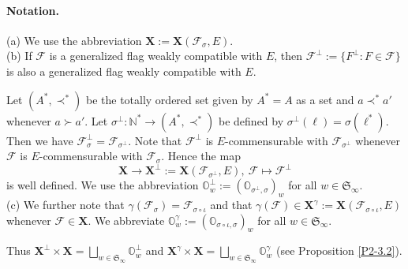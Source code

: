 \documentclass{amsart}
\theoremstyle{definition}
\newcommand{\NN}{\mathbb{N}^*}
\begin{document}
\paragraph{\bf Notation.} 
{\rm (a)}
We use the abbreviation $\mathbf{X}:=\mathbf{X}(\mathcal{F}_\sigma,E)$. \\
{\rm (b)}
If $\mathcal{F}$ is a generalized flag weakly compatible with $E$,
then $\mathcal{F}^\perp:=\{F^\perp:F\in\mathcal{F}\}$ is also a generalized flag weakly compatible with $E$.

Let $(A^*,\prec^*)$ be the totally ordered set given by $A^*=A$ as a set and $a\prec^*a'$ whenever $a\succ a'$.
Let $\sigma^\perp:\NN\to(A^*,\prec^*)$ be defined by $\sigma^\perp(\ell)=\sigma(\ell^*)$.
Then we have
$\mathcal{F}_\sigma^\perp=\mathcal{F}_{\sigma^\perp}$.
Note that $\mathcal{F}^\perp$ is $E$-commensurable with $\mathcal{F}_{\sigma^\perp}$
whenever $\mathcal{F}$ is $E$-commensurable with $\mathcal{F}_\sigma$.
Hence the map 
\[\mathbf{X}\to\mathbf{X}^\perp:=\mathbf{X}(\mathcal{F}_{\sigma^\perp},E),\ \mathcal{F}\mapsto\mathcal{F}^\perp\]
is well defined.
We use the abbreviation $\pmb{\mathbb{O}}^\perp_w:=(\pmb{\mathbb{O}}_{\sigma^\perp,\sigma})_w$ for all $w\in\mathfrak{S}_\infty$. \\
{\rm (c)}
We further note that $\gamma(\mathcal{F}_\sigma)=\mathcal{F}_{\sigma\circ\iota}$
and that $\gamma(\mathcal{F})\in\mathbf{X}^\gamma:=\mathbf{X}(\mathcal{F}_{\sigma\circ\iota},E)$ whenever $\mathcal{F}\in\mathbf{X}$.
We abbreviate  $\pmb{\mathbb{O}}^\gamma_w:=(\pmb{\mathbb{O}}_{\sigma\circ\iota,\sigma})_w$ for all $w\in\mathfrak{S}_\infty$.

\medskip
Thus
$\displaystyle \mathbf{X}^\perp\times\mathbf{X}=\bigsqcup_{w\in\mathfrak{S}_\infty}\pmb{\mathbb{O}}^\perp_w$
and
$\displaystyle \mathbf{X}^\gamma\times\mathbf{X}=\bigsqcup_{w\in\mathfrak{S}_\infty}\pmb{\mathbb{O}}^\gamma_w$
(see Proposition \ref{P2-3.2}).
\end{document}

